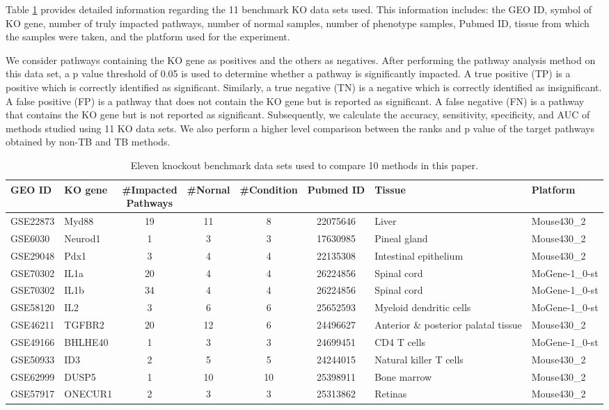 Table \ref{table:MouseDatasets} provides detailed information regarding the 11 benchmark KO data sets used. This information includes:  the GEO ID, symbol of KO gene, number of truly impacted pathways, number of normal samples, number of phenotype samples, Pubmed ID, tissue from which the samples were taken, and the platform used for the experiment.


We consider pathways containing the KO gene as positives and the others as negatives. After performing the pathway analysis method on this data set, a p value threshold of 0.05 is used to determine whether a pathway is significantly impacted. A true positive (TP) is a positive which is correctly identified as significant. 
Similarly, a true negative (TN) is a negative which is correctly identified as insignificant.
A false positive (FP) is a pathway that does not contain the KO gene but is reported as significant. A false negative (FN) is a pathway that contains the KO gene but is not reported as significant.
Subsequently, we calculate the accuracy, sensitivity, specificity, and AUC of methods studied using 11 KO data sets. 
We also perform a higher level comparison between the ranks and p value of the target pathways obtained by non-TB and TB methods.


\begin{landscape}
\setlength\LTleft{0pt}            %
\setlength\LTright{0pt}           %
\centering
\small
\begin{longtable}{@{}llccccll@{}}
\caption{Eleven knockout benchmark data sets used to compare 10 methods in this paper.\label{table:MouseDatasets}}\\
\hline
 \textbf{GEO ID}& \textbf{KO gene} & \makecell{\textbf{\#Impacted} \\\textbf{Pathways} }& \textbf{\#Nornal} & \textbf{\#Condition}& \textbf{Pubmed ID} & \textbf{Tissue} & \textbf{Platform}  \\
 \hline
GSE22873	&Myd88	&19	&11	&8	&22075646	&Liver				&Mouse430\_2 \\
GSE6030		&Neurod1	&1	&3	&3	&17630985	&Pineal gland			&Mouse430\_2 \\
GSE29048	&Pdx1	&3	&4	&4	&22135308	&Intestinal epithelium	&Mouse430\_2\\
GSE70302	&IL1a	&20	&4	&4	&26224856	&Spinal cord			&MoGene-1\_0-st\\
GSE70302	&IL1b	&34	&4	&4	&26224856	&Spinal cord			&MoGene-1\_0-st\\
GSE58120	&IL2		&3	&6	&6	&25652593	&Myeloid dendritic cells	&MoGene-1\_0-st\\
GSE46211	&TGFBR2	&20	&12	&6	&24496627	&Anterior \& posterior palatal tissue	&Mouse430\_2\\
GSE49166     &BHLHE40	&1	&3	&3	&24699451	&CD4 T cells			&MoGene-1\_0-st\\
GSE50933	&ID3		&2	&5	&5	&24244015	&Natural killer T cells	&Mouse430\_2\\
GSE62999	&DUSP5	&1	&10	&10	&25398911	&Bone marrow			&Mouse430\_2\\
GSE57917    &ONECUR1	&2	&3	&3	&25313862	&Retinas				&Mouse430\_2\\
\hline
 \end{longtable}
\end{landscape}

